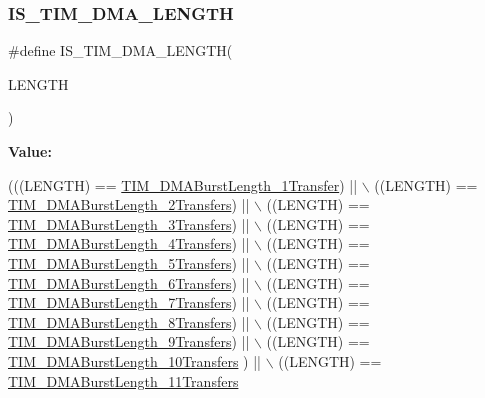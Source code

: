 \subsubsection{\texorpdfstring{I\+S\+\_\+\+T\+I\+M\+\_\+\+D\+M\+A\+\_\+\+L\+E\+N\+G\+TH}{IS\_TIM\_DMA\_LENGTH}}
{\footnotesize\ttfamily \#define I\+S\+\_\+\+T\+I\+M\+\_\+\+D\+M\+A\+\_\+\+L\+E\+N\+G\+TH(\begin{DoxyParamCaption}\item[{}]{L\+E\+N\+G\+TH }\end{DoxyParamCaption})}

{\bfseries Value\+:}
\begin{DoxyCode}
(((LENGTH) == \hyperlink{group___t_i_m___d_m_a___burst___length_gab87f91f1c5583b9888cb6bb37fc639e2}{TIM\_DMABurstLength\_1Transfer}) || \(\backslash\)
                                   ((LENGTH) == \hyperlink{group___t_i_m___d_m_a___burst___length_ga829504c3e8c90a9445f6a223bc3034f8}{TIM\_DMABurstLength\_2Transfers})
       || \(\backslash\)
                                   ((LENGTH) == \hyperlink{group___t_i_m___d_m_a___burst___length_ga3a99863a0925e0cc9a11b91aade66f11}{TIM\_DMABurstLength\_3Transfers})
       || \(\backslash\)
                                   ((LENGTH) == \hyperlink{group___t_i_m___d_m_a___burst___length_ga84bfeb309593a1ac580e233bf7514b36}{TIM\_DMABurstLength\_4Transfers})
       || \(\backslash\)
                                   ((LENGTH) == \hyperlink{group___t_i_m___d_m_a___burst___length_ga44f8aa51fbe8887a5f3c37a0e776902c}{TIM\_DMABurstLength\_5Transfers})
       || \(\backslash\)
                                   ((LENGTH) == \hyperlink{group___t_i_m___d_m_a___burst___length_ga8be40a21654eea72e9c1bf9922675b22}{TIM\_DMABurstLength\_6Transfers})
       || \(\backslash\)
                                   ((LENGTH) == \hyperlink{group___t_i_m___d_m_a___burst___length_gaf2ae83bd73b0e92b73e5ebfc11f9bfad}{TIM\_DMABurstLength\_7Transfers})
       || \(\backslash\)
                                   ((LENGTH) == \hyperlink{group___t_i_m___d_m_a___burst___length_ga8a760d7114425596736b0ecdbe5fdea6}{TIM\_DMABurstLength\_8Transfers})
       || \(\backslash\)
                                   ((LENGTH) == \hyperlink{group___t_i_m___d_m_a___burst___length_ga98b208205c133557a9d67a0921559a66}{TIM\_DMABurstLength\_9Transfers})
       || \(\backslash\)
                                   ((LENGTH) == \hyperlink{group___t_i_m___d_m_a___burst___length_ga2fc09f2148cf6ebddc8e67116212259c}{TIM\_DMABurstLength\_10Transfers}
      ) || \(\backslash\)
                                   ((LENGTH) == \hyperlink{group___t_i_m___d_m_a___burst___length_ga0ca63a3caeaf1e85bd54961891949de7}{TIM\_DMABurstLength\_11Transfers}

\end{DoxyCode}
